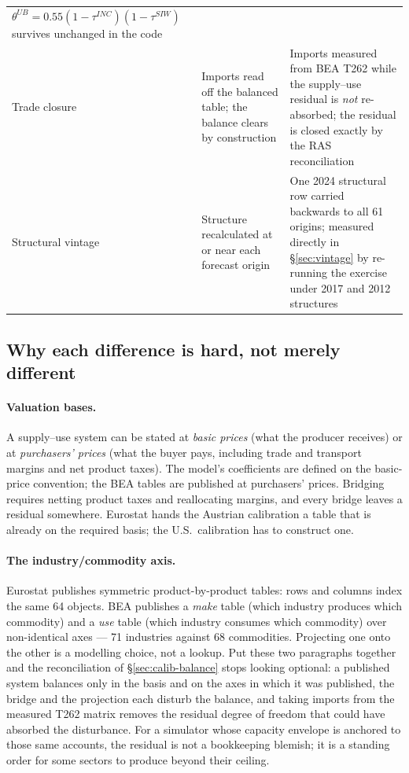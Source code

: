 \documentclass[11pt,a4paper]{article}
\begin{document}
\begin{table}[t]
\begin{tabular}{@{}p{}p{}p{}@{}}
  $\theta^{UB}=0.55(1-\tau^{INC})(1-\tau^{SIW})$ survives unchanged in the code \\[3pt]
Trade closure
& Imports read off the balanced table; the balance clears by construction
& Imports measured from BEA T262 while the supply--use residual is \emph{not} re-absorbed; the
  residual is closed exactly by the RAS reconciliation \\[3pt]
Structural vintage
& Structure recalculated at or near each forecast origin
& One 2024 structural row carried backwards to all 61 origins; measured directly in
  \S\ref{sec:vintage} by re-running the exercise under 2017 and 2012 structures \\
\bottomrule
\end{tabular}
\end{table}

\subsection{Why each difference is hard, not merely different}

\paragraph{Valuation bases.} A supply--use system can be stated at \emph{basic prices} (what the
producer receives) or at \emph{purchasers' prices} (what the buyer pays, including trade and
transport margins and net product taxes). The model's coefficients are defined on the basic-price
convention; the BEA tables are published at purchasers' prices. Bridging requires netting product
taxes and reallocating margins, and every bridge leaves a residual somewhere. Eurostat hands the
Austrian calibration a table that is already on the required basis; the U.S.\ calibration has to
construct one.

\paragraph{The industry/commodity axis.} Eurostat publishes symmetric product-by-product tables:
rows and columns index the same 64 objects. BEA publishes a \emph{make} table (which industry
produces which commodity) and a \emph{use} table (which industry consumes which commodity) over
non-identical axes --- 71 industries against 68 commodities. Projecting one onto the other is a
modelling choice, not a lookup. Put these two paragraphs together and the reconciliation of
\S\ref{sec:calib-balance} stops looking optional: a published system balances only in the basis
and on the axes in which it was published, the bridge and the projection each disturb the balance,
and taking imports from the measured T262 matrix removes the residual degree of freedom that could
have absorbed the disturbance. For a simulator whose capacity envelope is anchored to those same
accounts, the residual is not a bookkeeping blemish; it is a standing order for some sectors to
produce beyond their ceiling.
\end{document}
